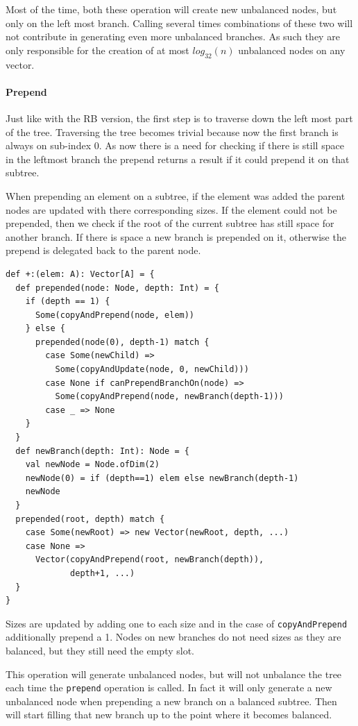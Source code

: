 Most of the time, both these operation will create new unbalanced nodes, but only on the left most branch. Calling several times combinations of these two will not contribute in generating even more unbalanced branches. As such they are only responsible for the creation of at most $ log_{32}(n)$ unbalanced nodes on any vector.

\paragraph{Prepend}
Just like with the RB version, the first step is to traverse down the left most part of the tree. Traversing the tree becomes trivial because now the first branch is always on sub-index 0. As now there is a need for checking if there is still space in the leftmost branch the prepend returns a result if it could prepend it on that subtree.  

When prepending an element on a subtree, if the element was added the parent nodes are updated with there corresponding sizes. If the element could not be prepended, then we check if the root of the current subtree has still space for another branch. If there is space a new branch is prepended on it, otherwise the prepend is delegated back to the parent node.

\begin{lstlisting}[frame=single]
def +:(elem: A): Vector[A] = {
  def prepended(node: Node, depth: Int) = {
    if (depth == 1) {
      Some(copyAndPrepend(node, elem))
    } else {
      prepended(node(0), depth-1) match {
        case Some(newChild) => 
          Some(copyAndUpdate(node, 0, newChild)))
        case None if canPrependBranchOn(node) => 
          Some(copyAndPrepend(node, newBranch(depth-1)))
        case _ => None
    }
  }
  def newBranch(depth: Int): Node = {
    val newNode = Node.ofDim(2)
    newNode(0) = if (depth==1) elem else newBranch(depth-1)
    newNode
  }
  prepended(root, depth) match {
    case Some(newRoot) => new Vector(newRoot, depth, ...)  
    case None => 
      Vector(copyAndPrepend(root, newBranch(depth)), 
             depth+1, ...)
  }
}
\end{lstlisting}

Sizes are updated by adding one to each size and in the case of \texttt{copyAndPrepend} additionally prepend a 1. Nodes on new branches do not need sizes as they are balanced, but they still need the empty slot.

This operation will generate unbalanced nodes, but will not unbalance the tree each time the \texttt{prepend} operation is called. In fact it will only generate a new unbalanced node when prepending a new branch on a balanced subtree. Then will start filling that new branch up to the point where it becomes balanced. 

